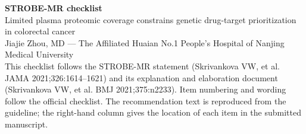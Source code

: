 \documentclass[10pt,a4paper]{article}
\begin{document}
{\Large\bfseries STROBE-MR checklist}\\[0.4em]
{\large Limited plasma proteomic coverage constrains genetic drug-target prioritization in colorectal cancer}\\[0.2em]
Jiajie Zhou, MD --- The Affiliated Huaian No.1 People's Hospital of Nanjing Medical University\\[0.8em]
This checklist follows the STROBE-MR statement (Skrivankova VW, et al. JAMA 2021;326:1614--1621) and its explanation and elaboration document (Skrivankova VW, et al. BMJ 2021;375:n2233). Item numbering and wording follow the official checklist. The recommendation text is reproduced from the guideline; the right-hand column gives the location of each item in the submitted manuscript.
\vspace{0.8em}
\end{document}

